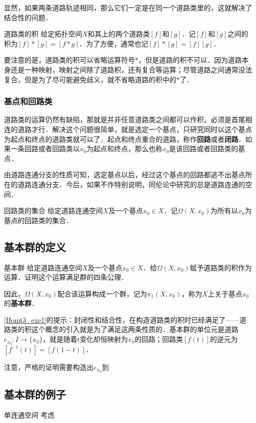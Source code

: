 显然，如果两条道路轨迹相同，那么它们一定是在同一个道路类里的，这就解决了结合性的问题．

\begin{definition}{道路类的积}
给定拓扑空间$X$和其上的两个道路类$[f]$和$[g]$．记$[f]$和$[g]$之间的积为$[f]*[g]=[f*g]$．为了方便，通常也记$[f]*[g]=[f][g]$．
\end{definition}

要注意的是，道路类的积可以省略运算符号$*$，但是道路的积不可以．因为道路本身还是一种映射，映射之间除了道路积，还有复合等运算；尽管道路之间通常没法复合，但是为了尽可能避免歧义，就不省略道路的积中的$*$了．

\subsubsection{基点和回路类}

道路类的运算仍然有缺陷，那就是并非任意道路类之间都可以作积，必须是首尾相连的道路才行．解决这个问题很简单，就是选定一个基点，只研究同时以这个基点为起点和终点的道路类就可以了．起点和终点重合的道路，称作\textbf{回路}或者\textbf{闭路}．如果一条回路或者回路类以$x_0$为起点和终点，那么也称$x_0$是该回路或者回路类的基点．

由道路连通分支的性质可知，选定基点以后，经过这个基点的回路都逃不出基点所在的道路连通分支．今后，如果不作特别说明，同伦论中研究的总是道路连通的空间．

\begin{definition}{回路类的集合}
给定道路连通空间$X$及一个基点$x_0\in X$．记$\Omega(X, x_0)$为所有以$x_0$为基点的回路类的集合．
\end{definition}

\subsection{基本群的定义}

\begin{exercise}{基本群}\label{Homt3_exe1}
给定道路连通空间$X$及一个基点$x_0\in X$．给$\Omega(X, x_0)$赋予道路类的积作为运算．证明这个运算满足群的四条公理．

因此，$\Omega(X, x_0)$配合该运算构成一个群，记为$\pi_1(X, x_0)$，称为$X$上关于基点$x_0$的\textbf{基本群}．
\end{exercise}

\autoref{Homt3_exe1}的提示：封闭性和结合性，在构造道路类的积时已经满足了——道路类的积这个概念的引入就是为了满足这两条性质的．基本群的单位元是道路$e_{x_0}: I\rightarrow\{x_0\}$，就是随着$t$变化却恒映射为$x_0$的回路；回路类$[f(t)]$的逆元为$[f^{-1}(t)]=[f(1-t)]$．

注意，严格的证明需要构造出$e_{x_0}$到$$

\subsection{基本群的例子}

\begin{example}{单连通空间}
考虑
\end{example}





